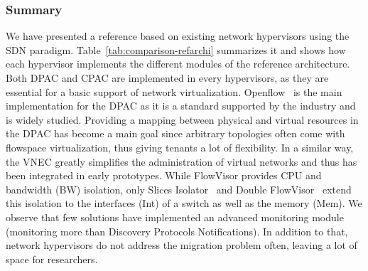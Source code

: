 \subsubsection{Summary}
We have presented a reference based on existing network hypervisors using the SDN paradigm.
Table~\ref{tab:comparison-refarchi} summarizes it and shows how each hypervisor implements the different modules of the reference architecture.
Both DPAC and CPAC are implemented in every hypervisors, as they are essential for a basic support of network virtualization.
Openflow~\cite{Openflow-McKeown2008} is the main implementation for the DPAC as it is a standard supported by the industry and is widely studied.
Providing a mapping between physical and virtual resources in the DPAC has become a main goal since arbitrary topologies often come with flowspace virtualization, thus giving tenants a lot of flexibility.
In a similar way, the VNEC greatly simplifies the administration of virtual networks and thus has been integrated in early prototypes.
While FlowVisor provides CPU and bandwidth (BW) isolation, only Slices Isolator~\cite{SlicesIsolator-El-Azzab2011} and Double FlowVisor~\cite{DoubleFV-Yin2013} extend this isolation to the interfaces (Int) of a switch as well as the memory (Mem).
We observe that few solutions have implemented an advanced monitoring module (\ie monitoring more than Discovery Protocols Notifications).
In addition to that, network hypervisors do not address the migration problem often, leaving a lot of space for researchers.


